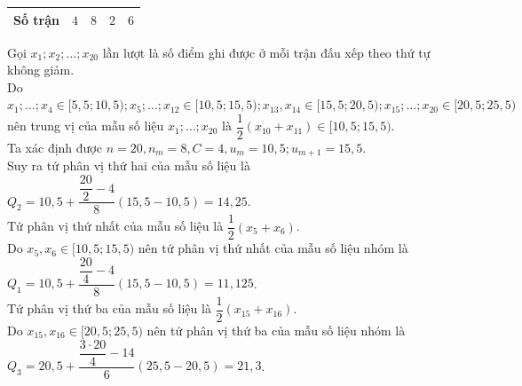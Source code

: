 \begin{ex}
{\begin{itemchoice}
\begin{center}
\begin{tabular}{|c|c|c|c|c|}
		 \hline
		Số trận&$4$&$8$&$2$&$6$\\ 
		\hline 
	\end{tabular}
	\end{center}
	Gọi $x_1;x_2;\ldots;x_{20}$ lần lượt là số điểm ghi được ở mỗi trận đấu xếp theo thứ tự  không giảm.\\
	Do $x_1;\ldots;x_4\in [5{,}5;10{,}5);x_5;\ldots;x_{12}\in [10{,}5;15{,}5);x_{13},x_{14}\in [15{,}5;20{,}5);x_{15};\ldots;x_{20}\in  [20{,}5;25{,}5)$ nên trung vị của mẫu số liệu $x_1;\ldots;x_{20}$ là $\dfrac{1}{2}\left(x_{10}+x_{11}\right)\in [10{,}5;15{,}5)$.\\
	Ta xác  định được $n=20,n_m=8,C=4,u_m=10{,}5;u_{m+1}=15{,}5$.\\
	Suy ra tứ phân vị thứ hai của mẫu  số liệu là $Q_2=10{,}5+\dfrac{\dfrac{20}{2}-4}{8}(15{,}5-10{,}5)=14{,}25$.\\
	Tứ phân  vị thứ nhất của mẫu số liệu là $\dfrac{1}{2}\left(x_5+x_6\right)$.\\
	Do $x_5,x_6\in [10{,}5;15{,}5)$  nên tứ phân vị thứ nhất của mẫu số liệu nhóm là
	 $Q_1=10{,}5+\dfrac{\dfrac{20}{4}-4}{8}(15{,}5-10{,}5)=11{,}125$.\\
	Tứ phân vị thứ ba của mẫu số  liệu là $\dfrac{1}{2}\left(x_{15}+x_{16}\right)$.\\
	Do  $x_{15},x_{16}\in [20{,}5;25{,}5)$ nên tứ phân vị thứ ba của mẫu số liệu nhóm là\\
	$Q_3=20{,}5+\dfrac{\dfrac{3\cdot20}{4}-14}{6}\left(25{,}5-20{,}5\right)=21{,}3$. 
	\end{itemchoice}
} 
\end{ex}

